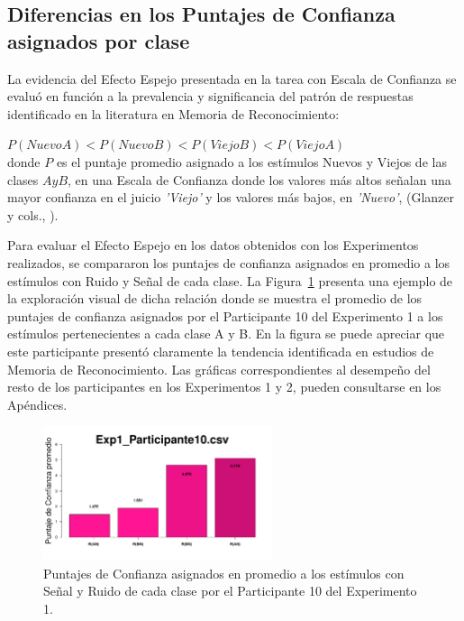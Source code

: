 \subsection{Diferencias en los Puntajes de Confianza asignados por clase}

La evidencia del Efecto Espejo presentada en la tarea con Escala de Confianza se evaluó en función a la prevalencia y significancia del patrón de respuestas identificado en la literatura en Memoria de Reconocimiento:
 
\begin{center}
$P(NuevoA) < P(NuevoB) < P(ViejoB) < P(ViejoA)$\\
donde $P$ es el puntaje promedio asignado a los estímulos Nuevos y Viejos de las clases $A y B$, en una Escala de Confianza donde los valores más altos señalan una mayor confianza en el juicio \textit{'Viejo'} y los valores más bajos, en \textit{'Nuevo'}, (Glanzer y cols., \citeyear{Glanzer1993}).\\
\end{center}

Para evaluar el Efecto Espejo en los datos obtenidos con los Experimentos realizados, se compararon los puntajes de confianza asignados en promedio a los estímulos con Ruido y Señal de cada clase. La Figura~\ref{fig:MirrorRating_E1_P10} presenta una ejemplo de la exploración visual de dicha relación donde se muestra el promedio de los puntajes de confianza asignados por el Participante 10 del Experimento 1 a los estímulos pertenecientes a cada clase A y B. En la figura se puede apreciar que este participante presentó claramente la tendencia identificada en estudios de Memoria de Reconocimiento. Las gráficas correspondientes al desempeño del resto de los participantes en los Experimentos 1 y 2, pueden consultarse en los Apéndices.\\

\begin{figure}[th]
\centering
\includegraphics[width=0.60\textwidth]{Figures/MirrorRating_Exp1_P10}
\decoRule
\caption[Explorando datos individuales (ejemplo): Promedio de los puntajes de confianza registrados para cada tipo y clase de ensayo]{Puntajes de Confianza asignados en promedio a los estímulos con Señal y Ruido de cada clase por el Participante 10 del Experimento 1.}
\label{fig:MirrorRating_E1_P10}
\end{figure}

